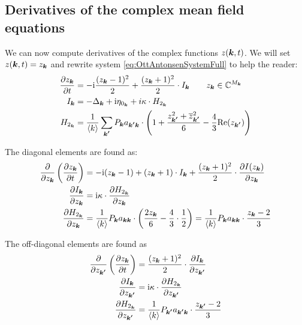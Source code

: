 \subsection{Derivatives of the complex mean field equations}
We can now compute derivatives of the complex functions $z({\boldsymbol{k}},t)$. We will set $z({\boldsymbol{k}}, t) = z_{{\boldsymbol{k}}}$ and rewrite system \eqref{eq:OttAntonsenSystemFull} to help the reader:
\begin{align}
\frac{\partial z_{{\boldsymbol{k}}}}{\partial t} &= -{\rm{i}} \frac{(z_{{\boldsymbol{k}}}-1)^{2}}{2} + \frac{(z_{{\boldsymbol{k}}}+1)^{2}}{2} \cdot I_{{\boldsymbol{k}}} \qquad z_{{\boldsymbol{k}}} \in {\mathbb{C}}^{M_{\boldsymbol{k}}} \nonumber \\
I_{{\boldsymbol{k}}} &= -\Delta_{{\boldsymbol{k}}} + {\rm{i}} \eta_{0_{{\boldsymbol{k}}}} + i \kappa \cdot H_{2_{{\boldsymbol{k}}}} \label{eq:OttAntonsenSystemFull_k} \\
H_{2_{{\boldsymbol{k}}}} &= \frac{1}{{\langle k\rangle}} \sum_{{\boldsymbol{k'}}} P_{{\boldsymbol{k}}} a_{{\boldsymbol{k'}} {\boldsymbol{k}}} \cdot \left( 1 + \frac{z_{{\boldsymbol{k'}}}^2 + \overline{z}_{{\boldsymbol{k'}}}^2}{6} - \frac{4}{3} {\operatorname{Re}}(z_{{\boldsymbol{k'}}}) \right) \nonumber
\end{align}

The diagonal elements are found as:
\begin{equation}
\begin{aligned}[b]
\frac{\partial}{\partial z_{{\boldsymbol{k}}}}\left(\frac{\partial z_{{\boldsymbol{k}}}}{\partial t} \right) &= - {\rm{i}}(z_{{\boldsymbol{k}}} - 1) + (z_{{\boldsymbol{k}}} + 1) \cdot I_{{\boldsymbol{k}}} +  \frac{(z_{{\boldsymbol{k}}}+1)^{2}}{2} \cdot \frac{\partial I(z_{{\boldsymbol{k}}})}{\partial z_{{\boldsymbol{k}}}} \\
\frac{\partial I_{{\boldsymbol{k}}}}{\partial z_{{\boldsymbol{k}}}} &= {\rm{i}} \kappa \cdot \frac{\partial H_{2_{{\boldsymbol{k}}}}}{\partial z_{{\boldsymbol{k}}}} \\
\frac{\partial H_{2_{{\boldsymbol{k}}}}}{\partial z_{{\boldsymbol{k}}}} &= \frac{1}{{\langle k\rangle}} P_{{\boldsymbol{k}}} a_{{\boldsymbol{k}} {\boldsymbol{k}}} \cdot \left(\frac{2 z_{{\boldsymbol{k}}}}{6} - \frac{4}{3} \cdot \frac{1}{2} \right) = \frac{1}{{\langle k\rangle}} P_{{\boldsymbol{k}}} a_{{\boldsymbol{k}} {\boldsymbol{k}}} \cdot\frac{z_{{\boldsymbol{k}}} - 2}{3}
\end{aligned}
\label{eq:OttAntonsenSystemJacobianDiagonal}
\end{equation}

The off-diagonal elements are found as
\begin{equation}
\begin{aligned}[b]
\frac{\partial}{\partial z_{{\boldsymbol{k'}}}}\left(\frac{\partial z_{{\boldsymbol{k}}}}{\partial t} \right) &= \frac{(z_{{\boldsymbol{k}}} + 1)^{2}}{2} \cdot \frac{\partial I_{{\boldsymbol{k}}}}{\partial z_{{\boldsymbol{k'}}}} \\
\frac{\partial I_{{\boldsymbol{k}}}}{\partial z_{{\boldsymbol{k'}}}} &= {\rm{i}} \kappa \cdot \frac{\partial H_{2_{{\boldsymbol{k}}}}}{\partial z_{{\boldsymbol{k'}}}} \\
\frac{\partial H_{2_{{\boldsymbol{k}}}}}{\partial z_{{\boldsymbol{k'}}}} &= \frac{1}{{\langle k\rangle}} P_{{\boldsymbol{k'}}} a_{{\boldsymbol{k'}} {\boldsymbol{k}}} \cdot \frac{z_{{\boldsymbol{k'}}} - 2}{3}
\end{aligned}
\label{eq:OttAntonsenSystemJacobianDiagonal}
\end{equation}



